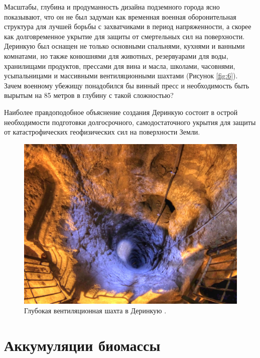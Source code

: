 \documentclass[10pt,twocolumn,letterpaper]{article}
\begin{document}
Масштабы, глубина и продуманность дизайна подземного города ясно показывают, что он не был задуман как временная военная оборонительная структура для лучшей борьбы с захватчиками в период напряженности, а скорее как долговременное укрытие для защиты от смертельных сил на поверхности. Деринкую был оснащен не только основными спальнями, кухнями и ванными комнатами, но также конюшнями для животных, резервуарами для воды, хранилищами продуктов, прессами для вина и масла, школами, часовнями, усыпальницами и массивными вентиляционными шахтами (Рисунок \ref{fig:6}). Зачем военному убежищу понадобился бы винный пресс и необходимость быть вырытым на 85 метров в глубину с такой сложностью?

Наиболее правдоподобное объяснение создания Деринкую состоит в острой необходимости подготовки долгосрочного, самодостаточного укрытия для защиты от катастрофических геофизических сил на поверхности Земли.

\begin{figure}[t]
\begin{center}
   \includegraphics[width=1\linewidth]{derinkuyu-air.jpg}
\end{center}
   \caption{Глубокая вентиляционная шахта в Деринкую \cite{53}.}
\label{fig:6}
\label{fig:onecol}
\end{figure}

\section{Аккумуляции биомассы}
\end{document}

